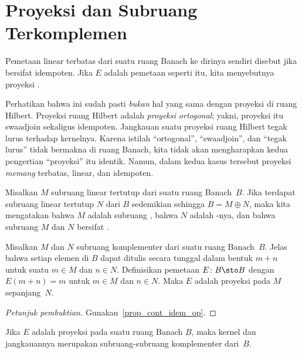 \section{Proyeksi dan Subruang Terkomplemen}
\begin{defn}
 Pemetaan linear terbatas dari suatu ruang Banach ke dirinya sendiri disebut
 jika bersifat idempoten. Jika $E$ adalah pemetaan seperti itu, kita menyebutnya
proyeksi .
\end{defn}

Perhatikan bahwa ini sudah pasti \emph{bukan} hal yang sama dengan proyeksi di
ruang Hilbert. Proyeksi ruang Hilbert adalah \emph{proyeksi ortogonal}; yakni,
proyeksi itu swaadjoin sekaligus idempoten. Jangkauan suatu proyeksi ruang Hilbert
tegak lurus terhadap kernelnya. Karena istilah ``ortogonal'', ``swaadjoin'', dan
``tegak lurus'' tidak bermakna di ruang Banach, kita tidak akan mengharapkan kedua pengertian
``proyeksi'' itu identik. Namun, dalam kedua kasus tersebut proyeksi \emph{memang}
terbatas, linear, dan idempoten.

\begin{defn} Misalkan $M$ subruang linear tertutup dari suatu ruang Banach~$B$. Jika terdapat
subruang linear tertutup $N$ dari $B$ sedemikian sehingga $B = M \oplus N$, maka kita mengatakan bahwa $M$ adalah
subruang , bahwa $N$ adalah
-nya, dan bahwa subruang $M$ dan $N$ bersifat
.
\end{defn}

\begin{prop}\label{C069814} Misalkan $M$ dan $N$ subruang komplementer dari suatu ruang Banach~$B$. Jelas bahwa setiap
elemen di $B$ dapat ditulis secara tunggal dalam bentuk $m + n$ untuk suatu $m \in M$ dan $n \in
N$. Definisikan pemetaan $E \colon B \sto B$ dengan $E(m + n) = m$ untuk $m \in M$ dan $n \in N$.
Maka $E$ adalah proyeksi pada $M$ sepanjang~$N$.
\end{prop}

\begin{proof}[\emph{Petunjuk pembuktian}] Gunakan~\ref{prop_cont_idem_op}.  \ns
\end{proof}

\begin{prop}\label{C069817} Jika $E$ adalah proyeksi pada suatu ruang Banach $B$, maka kernel dan jangkauannya merupakan
subruang-subruang komplementer dari~$B$.
\end{prop}

